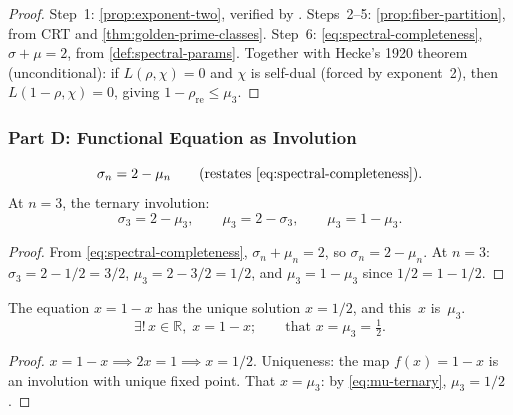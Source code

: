 \begin{proof}
Step~1: \cref{prop:exponent-two}, verified by .
Steps~2--5: \cref{prop:fiber-partition}, from CRT and
\cref{thm:golden-prime-classes}.
Step~6: \cref{eq:spectral-completeness}, $\sigma+\mu=2$,
from \cref{def:spectral-params}.
Together with Hecke's 1920 theorem (unconditional): if $L(\rho,\chi)=0$
and $\chi$ is self-dual (forced by exponent~2), then
$L(1-\rho,\chi)=0$, giving $1-\rho_{\mathrm{re}} \le \mu_3$.
\end{proof}


\subsubsection{Part D: Functional Equation as Involution}

\begin{proposition}\label{prop:spectral-involution}
\begin{equation}\label{eq:spectral-involution}
  \sigma_n = 2 - \mu_n
  \qquad\text{(restates~\cref{eq:spectral-completeness})}.
\end{equation}
At $n=3$, the ternary involution:
\begin{equation}\label{eq:ternary-involution}
  \sigma_3 = 2 - \mu_3, \qquad
  \mu_3 = 2 - \sigma_3, \qquad
  \mu_3 = 1 - \mu_3.
\end{equation}
\end{proposition}

\begin{proof}
From \cref{eq:spectral-completeness}, $\sigma_n + \mu_n = 2$,
so $\sigma_n = 2 - \mu_n$.  At $n=3$: $\sigma_3 = 2 - 1/2 = 3/2$,
$\mu_3 = 2 - 3/2 = 1/2$, and $\mu_3 = 1 - \mu_3$ since $1/2 = 1 - 1/2$.
\end{proof}


\begin{theorem}\label{thm:fixed-point}
The equation $x = 1-x$ has the unique solution $x = 1/2$, and
this~$x$ is~$\mu_3$.
\begin{equation}\label{eq:fixed-point-mu3}
  \exists!\, x\in\mathbb{R},\; x = 1-x; \qquad
  \text{that } x = \mu_3 = \tfrac{1}{2}.
\end{equation}
\end{theorem}

\begin{proof}
$x = 1 - x \implies 2x = 1 \implies x = 1/2$.  Uniqueness: the map
$f(x)=1-x$ is an involution with unique fixed point.  That
$x = \mu_3$: by \cref{eq:mu-ternary}, $\mu_3 = 1/2$.
\end{proof}


